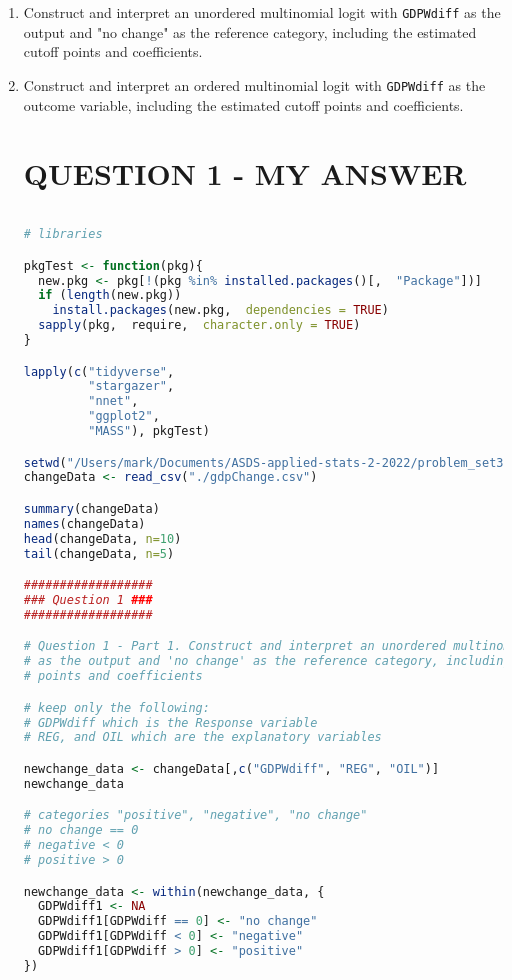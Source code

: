 \documentclass[12pt,letterpaper]{article}
\begin{document}
\begin{enumerate}
	\item Construct and interpret an unordered multinomial logit with \texttt{GDPWdiff} as the output and "no change" as the reference category, including the estimated cutoff points and coefficients.
	\item Construct and interpret an ordered multinomial logit with \texttt{GDPWdiff} as the outcome variable, including the estimated cutoff points and coefficients.
	
	
\section*{QUESTION 1 - MY ANSWER} 

	\begin{lstlisting}[language=R]
	
# libraries

pkgTest <- function(pkg){
  new.pkg <- pkg[!(pkg %in% installed.packages()[,  "Package"])]
  if (length(new.pkg)) 
    install.packages(new.pkg,  dependencies = TRUE)
  sapply(pkg,  require,  character.only = TRUE)
}

lapply(c("tidyverse",
         "stargazer",
         "nnet",
         "ggplot2",
         "MASS"), pkgTest)

setwd("/Users/mark/Documents/ASDS-applied-stats-2-2022/problem_set3")
changeData <- read_csv("./gdpChange.csv")

summary(changeData)
names(changeData)
head(changeData, n=10)
tail(changeData, n=5)

##################
### Question 1 ###
##################

# Question 1 - Part 1. Construct and interpret an unordered multinominal logit with GDPWdiff 
# as the output and 'no change' as the reference category, including the estimated cutoff 
# points and coefficients

# keep only the following:
# GDPWdiff which is the Response variable
# REG, and OIL which are the explanatory variables

newchange_data <- changeData[,c("GDPWdiff", "REG", "OIL")]
newchange_data

# categories "positive", "negative", "no change"
# no change == 0
# negative < 0
# positive > 0

newchange_data <- within(newchange_data, {
  GDPWdiff1 <- NA
  GDPWdiff1[GDPWdiff == 0] <- "no change"
  GDPWdiff1[GDPWdiff < 0] <- "negative"
  GDPWdiff1[GDPWdiff > 0] <- "positive"
})


\end{lstlisting}
\end{enumerate}
\end{document}
